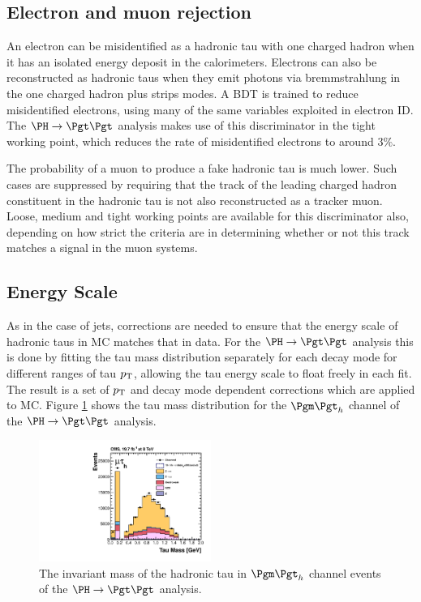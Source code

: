 \subsection{Electron and muon rejection}

An electron can be misidentified as a hadronic tau with one charged hadron when
it has an isolated energy deposit in the calorimeters. Electrons can also be
reconstructed as hadronic taus when they emit photons via bremmstrahlung in the
one charged hadron plus strips modes. A \ac{BDT} is trained to reduce
misidentified electrons, using many of the same variables exploited in electron
ID. The $\PH\to\Pgt\Pgt$ analysis makes use of this discriminator in the tight
working point, which reduces the rate of misidentified electrons to around
$3\%$. 

The probability of a muon to produce a fake hadronic tau is much lower. Such
cases are suppressed by requiring that the track of the leading charged hadron
constituent in the hadronic tau is not also reconstructed as a tracker muon.
Loose, medium and tight working points are available for this discriminator
also, depending on how strict the criteria are in determining whether or not
this track matches a signal in the muon systems. 

\subsection{Energy Scale}

As in the case of jets, corrections are needed to ensure that the energy scale
of hadronic taus in \ac{MC} matches that in data. For the $\PH \to \Pgt\Pgt$
analysis this is done by fitting the tau mass distribution separately for each
decay mode for different ranges of tau $p_{\mathrm{T}}$, allowing the tau energy scale to
float freely in each fit. The result is a set of $p_{\mathrm{T}}$ and decay mode dependent
corrections which are applied to MC. Figure \ref{fig:taumass} shows the tau
mass distribution for the $\mutau$ channel of the $\PH\to\Pgt\Pgt$ analysis. 

\begin{figure}
\begin{center}
    \includegraphics[width=0.5\textwidth]
      {plots/reco/m_2_inclusive_mt_2012.pdf}
\end{center}
\caption{The invariant mass of the hadronic tau in $\mutau$ channel events of
the $\PH\to\Pgt\Pgt$ analysis.}
\label{fig:taumass}
\end{figure}

